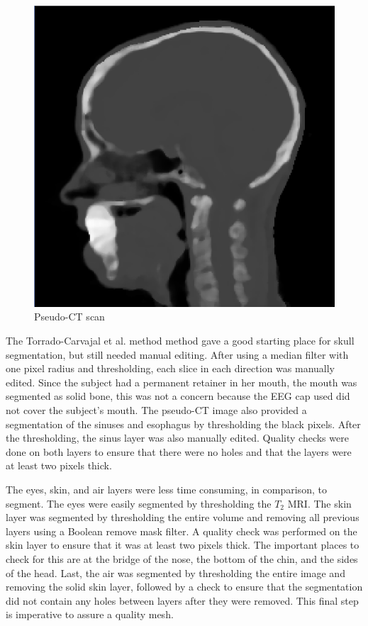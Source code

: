 \begin{figure}[H]
\begin{center}
\includegraphics[width=.75\textwidth]{Figures/pseudo_CT}
\caption{Pseudo-CT scan}
\label{fig:ct}
\end{center}
\end{figure}

The Torrado-Carvajal et al. method method gave a good starting place for skull segmentation, but still needed manual editing. After using a median filter with one pixel radius and thresholding, each slice in each direction was manually edited. Since the subject had a permanent retainer in her mouth, the mouth was segmented as solid bone, this was not a concern because the EEG cap used did not cover the subject's mouth. The pseudo-CT image also provided a segmentation of the sinuses and esophagus by thresholding the black pixels. After the thresholding, the sinus layer was also manually edited. Quality checks were done on both layers to ensure that there were no holes and that the layers were at least two pixels thick.

The eyes, skin, and air layers were less time consuming, in comparison, to segment. The eyes were easily segmented by thresholding the $T_2$ MRI. The skin layer was segmented by thresholding the entire volume and removing all previous layers using a Boolean remove mask filter. A quality check was performed on the skin layer to ensure that it was at least two pixels thick. The important places to check for this are at the bridge of the nose, the bottom of the chin, and the sides of the head. Last, the air was segmented by thresholding the entire image and removing the solid skin layer, followed by a check to ensure that the segmentation did not contain any holes between layers after they were removed. This final step is imperative to assure a quality mesh.

